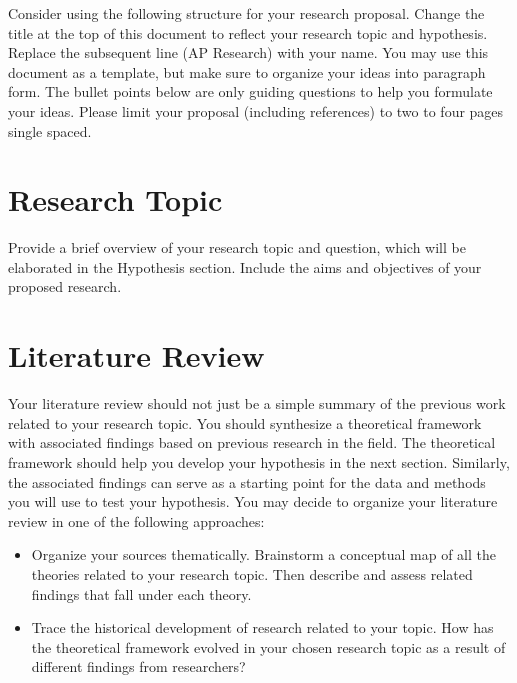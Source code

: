 Consider using the following structure for your research proposal. Change the title at the top of this document to reflect your research topic and hypothesis. Replace the subsequent line (AP Research) with your name. You may use this document as a template, but make sure to organize your ideas into paragraph form. The bullet points below are only guiding questions to help you formulate your ideas. Please limit your proposal (including references) to two to four pages single spaced.

\section{Research Topic}

Provide a brief overview of your research topic and question, which will be elaborated in the Hypothesis section. Include the aims and objectives of your proposed research. 

\section{Literature Review}

Your literature review should not just be a simple summary of the previous work related to your research topic. You should synthesize a theoretical framework with associated findings based on previous research in the field. The theoretical framework should help you develop your hypothesis in the next section. Similarly, the associated findings can serve as a starting point for the data and methods you will use to test your hypothesis. You may decide to organize your literature review in one of the following approaches:

\begin{itemize}

\item Organize your sources thematically. Brainstorm a conceptual map of all the theories related to your research topic. Then describe and assess related findings that fall under each theory.

\item Trace the historical development of research related to your topic. How has the theoretical framework evolved in your chosen research topic as a result of different findings from researchers?

\end{itemize}

